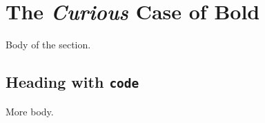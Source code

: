 \section{The \emph{Curious} Case of \textbf{Bold}}

Body of the section.

\subsection*{Heading with \texttt{code}}

More body.
